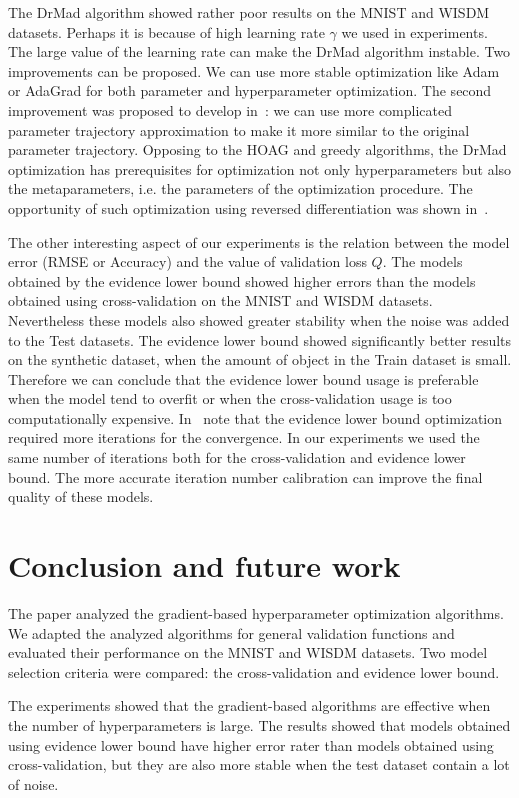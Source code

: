 The DrMad algorithm showed rather poor results on the MNIST and WISDM datasets. Perhaps it is because of high learning rate $\gamma$ we used in experiments. The large value of the learning rate can make the DrMad algorithm instable. Two improvements can be proposed. We can use more stable optimization like Adam or AdaGrad for both parameter and hyperparameter optimization. The second improvement was proposed to develop in~\cite{hyper_mad}: we can use more complicated parameter trajectory approximation to make it more similar to the original parameter trajectory. Opposing to the HOAG and greedy algorithms, the DrMad optimization has prerequisites for optimization not only hyperparameters but also the metaparameters, i.e. the parameters  of the optimization procedure. The opportunity of such optimization using reversed differentiation was shown in~\cite{hyper_mad}. 

The other interesting aspect of our experiments is the relation between the model error (RMSE or Accuracy) and the value of validation loss $Q$. The models obtained by the evidence lower bound showed higher errors than the models obtained using cross-validation on the MNIST and WISDM datasets. Nevertheless these models also showed greater stability when the noise was added to the Test datasets.  The evidence lower bound showed significantly better results on the synthetic dataset, when the amount of object in the Train dataset is small. Therefore we can conclude that the evidence lower bound usage is preferable when the model tend to overfit or when the cross-validation usage is too computationally expensive.   In~\cite{nips} note that the evidence lower bound optimization required more iterations for the convergence. In our experiments we used the same number of iterations both for the cross-validation and evidence lower bound. The more accurate iteration number calibration can improve the final quality of these models. 

\section{Conclusion and future work}
The paper analyzed the gradient-based hyperparameter optimization algorithms. We adapted the analyzed algorithms for general validation functions and evaluated their performance on the  MNIST and WISDM datasets. Two model selection criteria were compared: the cross-validation and evidence lower bound. 

The experiments showed that the gradient-based algorithms are effective when the number of hyperparameters is large. The results showed that models obtained using evidence lower bound have higher error rater than models obtained using cross-validation, but they are also more stable when the test dataset contain a lot of noise. 

